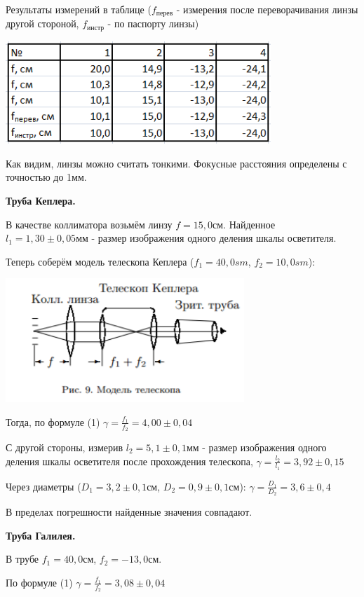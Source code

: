 \documentclass[12pt]{article}
\begin{document}
    Результаты измерений в таблице ($f_{перев}$ - измерения после переворачивания линзы другой стороной, $f_{инстр}$ - по паспорту линзы)
    
    \includegraphics[width=10cm]{table1.png}
    
    Как видим, линзы можно считать тонкими. Фокусные расстояния определены с точностью до 1мм.
    
    \textbf{Труба Кеплера.}
    
    В качестве коллиматора возьмём линзу $f = 15,0 см$. Найденное $l_1 = 1,30 \pm 0,05 мм$ - размер изображения одного деления шкалы осветителя.
    
    Теперь соберём модель телескопа Кеплера ($f_1 = 40,0 sm$, $f_2 = 10,0sm$):
    
    \includegraphics[width=9cm]{kepl.png}
    
    Тогда, по формуле (1) $\gamma = \frac{f_1}{f_2} = 4,00 \pm 0,04$
    
    С другой стороны, измерив $l_2 = 5,1 \pm 0,1 мм$ - размер изображения одного деления шкалы осветителя после прохождения телескопа, $\gamma = \frac{l_2}{l_1} = 3,92 \pm 0,15$
    
    Через диаметры ($D_1 = 3,2 \pm 0,1 см$, $D_2 = 0,9 \pm 0,1 см$): $\gamma = \frac{D_1}{D_2} = 3,6 \pm 0,4$
    
    В пределах погрешности найденные значения совпадают.
    
    \textbf{Труба Галилея.}
    
    В трубе $f_1 = 40,0 см$, $f_2 = -13,0см$.
    
    По формуле (1) $\gamma = \frac{f_1}{f_2} = 3,08 \pm 0,04$
    
\end{document}

